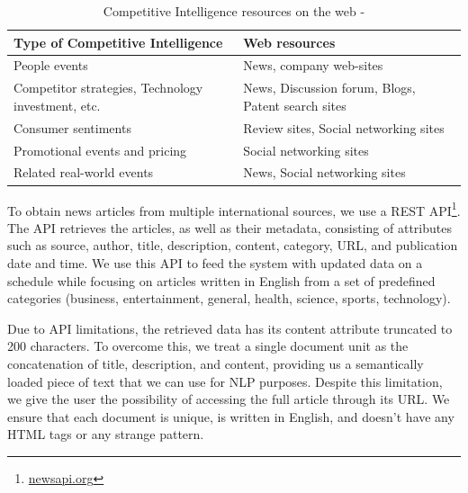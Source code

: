 \documentclass[a4paper]{article}
\begin{document}
\renewcommand{\arraystretch}{1.3}
\begin{table}[h!]
  \begin{center}
    \caption{Competitive Intelligence resources on the web - \citet{dey2011}}
    \label{ci_resources}
    \begin{tabular}{ |p{6cm}|p{6cm}| }
	  \hline
      \textbf{Type of Competitive Intelligence} & \textbf{Web resources} \\
      \hline
	  People events & News, company web-sites \\
	  \hline
	  Competitor strategies, Technology investment, etc. & News, Discussion forum, Blogs, Patent search sites \\
	  \hline
	  Consumer sentiments & Review sites, Social networking sites \\
	  \hline
	  Promotional events and pricing & Social networking sites \\
	  \hline
	  Related real-world events & News, Social networking sites \\
	  \hline
    \end{tabular}
  \end{center}
\end{table}

To obtain news articles from multiple international sources, we use a REST API\footnote{\href{https://newsapi.org/}{newsapi.org}}. The API retrieves the articles, as well as their metadata, consisting of attributes such as source, author, title, description, content, category, URL, and publication date and time. We use this API to feed the system with updated data on a schedule while focusing on articles written in English from a set of predefined categories (business, entertainment, general, health, science, sports, technology).

Due to API limitations, the retrieved data has its content attribute truncated to 200 characters. To overcome this, we treat a single document unit as the concatenation of title, description, and content, providing us a semantically loaded piece of text that we can use for NLP purposes. Despite this limitation, we give the user the possibility of accessing the full article through its URL. We ensure that each document is unique, is written in English, and doesn't have any HTML tags or any strange pattern.
\end{document}
